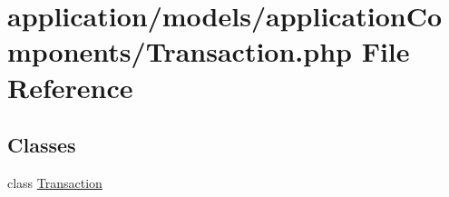 \hypertarget{_transaction_8php}{\section{application/models/application\-Components/\-Transaction.php File Reference}
\label{_transaction_8php}
}
\subsection*{Classes}
\begin{DoxyCompactItemize}
\item 
class \hyperlink{class_transaction}{Transaction}
\end{DoxyCompactItemize}
